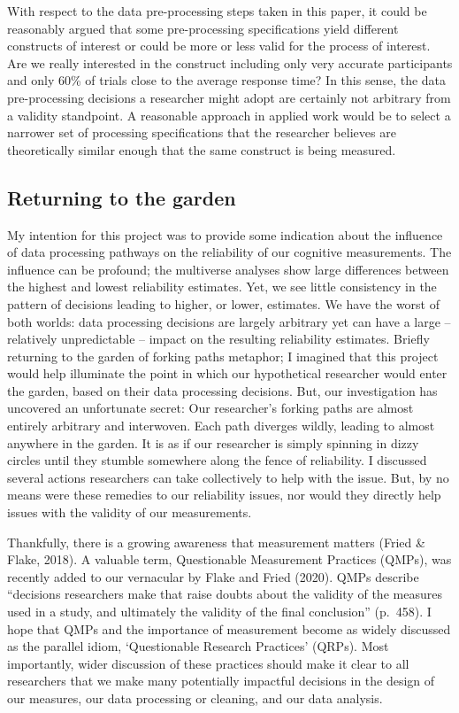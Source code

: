 \documentclass[
  english,
  man,floatsintext]{apa6}
\begin{document}
With respect to the data pre-processing steps taken in this paper, it could be reasonably argued that some pre-processing specifications yield different constructs of interest or could be more or less valid for the process of interest. Are we really interested in the construct including only very accurate participants and only 60\% of trials close to the average response time? In this sense, the data pre-processing decisions a researcher might adopt are certainly not arbitrary from a validity standpoint. A reasonable approach in applied work would be to select a narrower set of processing specifications that the researcher believes are theoretically similar enough that the same construct is being measured.

\hypertarget{returning-to-the-garden}{%
\subsection{Returning to the garden}\label{returning-to-the-garden}}

My intention for this project was to provide some indication about the influence of data processing pathways on the reliability of our cognitive measurements. The influence can be profound; the multiverse analyses show large differences between the highest and lowest reliability estimates. Yet, we see little consistency in the pattern of decisions leading to higher, or lower, estimates. We have the worst of both worlds: data processing decisions are largely arbitrary yet can have a large -- relatively unpredictable -- impact on the resulting reliability estimates. Briefly returning to the garden of forking paths metaphor; I imagined that this project would help illuminate the point in which our hypothetical researcher would enter the garden, based on their data processing decisions. But, our investigation has uncovered an unfortunate secret: Our researcher's forking paths are almost entirely arbitrary and interwoven. Each path diverges wildly, leading to almost anywhere in the garden. It is as if our researcher is simply spinning in dizzy circles until they stumble somewhere along the fence of reliability. I discussed several actions researchers can take collectively to help with the issue. But, by no means were these remedies to our reliability issues, nor would they directly help issues with the validity of our measurements.

Thankfully, there is a growing awareness that measurement matters (Fried \& Flake, 2018). A valuable term, Questionable Measurement Practices (QMPs), was recently added to our vernacular by Flake and Fried (2020). QMPs describe ``decisions researchers make that raise doubts about the validity of the measures used in a study, and ultimately the validity of the final conclusion'' (p.~458). I hope that QMPs and the importance of measurement become as widely discussed as the parallel idiom, `Questionable Research Practices' (QRPs). Most importantly, wider discussion of these practices should make it clear to all researchers that we make many potentially impactful decisions in the design of our measures, our data processing or cleaning, and our data analysis.
\end{document}
